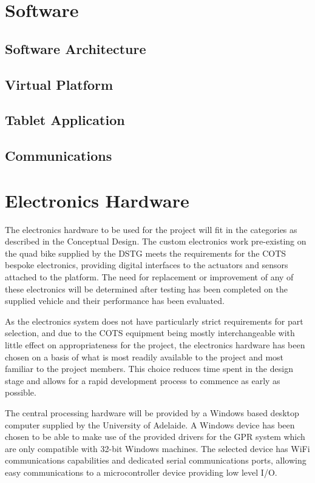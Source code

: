 \documentclass[main.tex]{subfiles}
\begin{document}
\section{Software}

\subsection{Software Architecture}

\subsection{Virtual Platform}

\subsection{Tablet Application}

\subsection{Communications}

\section{Electronics Hardware}
The electronics hardware to be used for the project will fit in the categories as described in the Conceptual Design. The custom electronics work pre-existing on the quad bike supplied by the DSTG meets the requirements for the COTS bespoke electronics, providing digital interfaces to the actuators and sensors attached to the platform. The need for replacement or improvement of any of these electronics will be determined after testing has been completed on the supplied vehicle and their performance has been evaluated.

As the electronics system does not have particularly strict requirements for part selection, and due to the COTS equipment being mostly interchangeable with little effect on appropriateness for the project, the electronics hardware has been chosen on a basis of what is most readily available to the project and most familiar to the project members. This choice reduces time spent in the design stage and allows for a rapid development process to commence as early as possible.

The central processing hardware will be provided by a Windows based desktop computer supplied by the University of Adelaide. A Windows device has been chosen to be able to make use of the provided drivers for the GPR system which are only compatible with 32-bit Windows machines. The selected device has WiFi communications capabilities and dedicated serial communications ports, allowing easy communications to a microcontroller device providing low level I/O.
\end{document}
